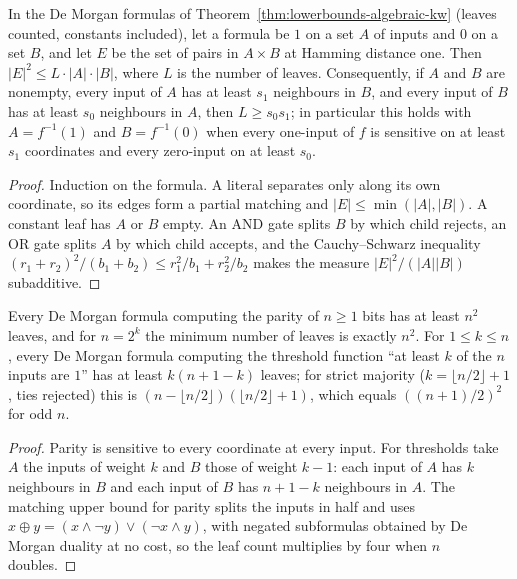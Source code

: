 \begin{theorem}[Khrapchenko]
  \label{thm:lowerbounds-algebraic-khrapchenko}
  \leanok
  In the De Morgan formulas of Theorem~\ref{thm:lowerbounds-algebraic-kw}
  (leaves counted, constants included), let a formula be $1$ on a set $A$ of
  inputs and $0$ on a set $B$, and let $E$ be the set of pairs in $A \times B$
  at Hamming distance one. Then $|E|^2 \le L \cdot |A| \cdot |B|$, where $L$ is
  the number of leaves. Consequently, if $A$ and $B$ are nonempty, every input
  of $A$ has at least $s_1$ neighbours in $B$, and every input of $B$ has at
  least $s_0$ neighbours in $A$, then $L \ge s_0 s_1$; in particular this holds
  with $A = f^{-1}(1)$ and $B = f^{-1}(0)$ when every one-input of $f$ is
  sensitive on at least $s_1$ coordinates and every zero-input on at least
  $s_0$.
\end{theorem}
\begin{proof}
  \leanok
  Induction on the formula. A literal separates only along its own
  coordinate, so its edges form a partial matching and $|E| \le
  \min(|A|, |B|)$. A constant leaf has $A$ or $B$ empty. An AND gate splits
  $B$ by which child rejects, an OR gate splits $A$ by which child accepts,
  and the Cauchy--Schwarz inequality
  $(r_1 + r_2)^2/(b_1 + b_2) \le r_1^2/b_1 + r_2^2/b_2$ makes the measure
  $|E|^2/(|A||B|)$ subadditive.
\end{proof}

\begin{corollary}
  \label{cor:lowerbounds-algebraic-khrapchenko-parity}
  \leanok
  Every De Morgan formula computing the parity of $n \ge 1$ bits has at least
  $n^2$ leaves, and for $n = 2^k$ the minimum number of leaves is exactly
  $n^2$. For $1 \le k \le n$, every De Morgan formula computing the threshold
  function ``at least $k$ of the $n$ inputs are $1$'' has at least
  $k (n + 1 - k)$ leaves; for strict majority ($k = \lfloor n/2 \rfloor + 1$,
  ties rejected) this is $(n - \lfloor n/2 \rfloor)(\lfloor n/2 \rfloor + 1)$,
  which equals $((n + 1)/2)^2$ for odd $n$.
\end{corollary}
\begin{proof}
  \leanok
  Parity is sensitive to every coordinate at every input. For thresholds take
  $A$ the inputs of weight $k$ and $B$ those of weight $k - 1$: each input of
  $A$ has $k$ neighbours in $B$ and each input of $B$ has $n + 1 - k$
  neighbours in $A$. The matching upper bound for parity splits the inputs in
  half and uses $x \oplus y = (x \wedge \neg y) \vee (\neg x \wedge y)$, with
  negated subformulas obtained by De Morgan duality at no cost, so the leaf
  count multiplies by four when $n$ doubles.
\end{proof}


